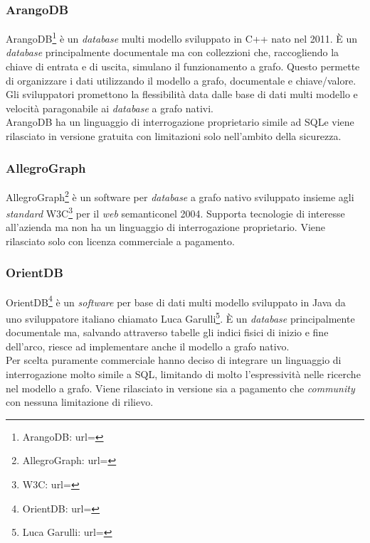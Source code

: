 \subsubsection{ArangoDB}
ArangoDB\footnote{ArangoDB: url= } è un \textit{database} multi modello sviluppato in C++ nato nel 2011. È un \textit{database} principalmente documentale ma con collezzioni che, raccogliendo la chiave di entrata e di uscita, simulano il funzionamento a grafo. Questo permette di organizzare i dati utilizzando il modello a grafo, documentale e chiave/valore.\\
Gli sviluppatori promettono la flessibilità data dalle base di dati multi modello e velocità paragonabile ai \textit{database} a grafo nativi.\\
ArangoDB ha un linguaggio di interrogazione proprietario simile ad SQL\glsfirstoccur e viene rilasciato in versione gratuita con limitazioni solo nell'ambito della sicurezza.
\subsubsection{AllegroGraph}
AllegroGraph\footnote{AllegroGraph: url= } è un software per \textit{database} a grafo nativo sviluppato insieme agli \textit{standard} W3C\footnote{W3C: url= } per il \textit{web} semantico\glsfirstoccur  nel 2004. Supporta tecnologie di interesse all'azienda ma non ha un linguaggio di interrogazione proprietario. Viene rilasciato solo con licenza commerciale a pagamento.
\subsubsection{OrientDB}
OrientDB\footnote{OrientDB: url= } è un \textit{software} per base di dati multi modello sviluppato in Java da uno sviluppatore italiano chiamato Luca Garulli\footnote{Luca Garulli: url= }. È un \textit{database} principalmente documentale ma, salvando attraverso tabelle gli indici fisici di inizio e fine dell'arco, riesce ad implementare anche il modello a grafo nativo. \\
Per scelta puramente commerciale hanno deciso di integrare un linguaggio di interrogazione molto simile a SQL, limitando di molto l'espressività nelle ricerche nel modello a grafo. Viene rilasciato in versione sia a pagamento che \textit{community} con nessuna limitazione di rilievo.
